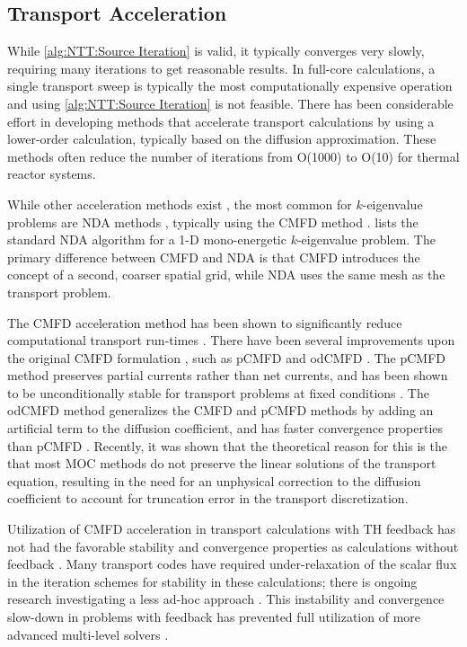 {{        \subsection{Transport Acceleration}{\label{ssec:NTT:Transport Acceleration}
            While \cref{alg:NTT:Source Iteration} is valid, it typically converges very slowly, requiring many iterations to get reasonable results.
            In full-core calculations, a single transport sweep is typically the most computationally expensive operation and using \cref{alg:NTT:Source Iteration} is not feasible.
            There has been considerable effort in developing methods that accelerate transport calculations by using a lower-order calculation, typically based on the diffusion approximation.
            These methods often reduce the number of iterations from O(1000) to O(10) for thermal reactor systems.

            While other acceleration methods exist \cite{Hebert2017}, the most common for $k$-eigenvalue problems are \ac{NDA} methods \cite{Smith2002}, typically using the \ac{CMFD} method \cite{Smith1983}.
             lists the standard \ac{NDA} algorithm for a 1-D mono-energetic $k$-eigenvalue problem.
            The primary difference between \ac{CMFD} and \ac{NDA} is that \ac{CMFD} introduces the concept of a second, coarser spatial grid, while \ac{NDA} uses the same mesh as the transport problem.

            The \ac{CMFD} acceleration method has been shown to significantly reduce computational transport run-times \cite{Smith2002,Anistratov2011,Collins2016}.
            There have been several improvements upon the original \ac{CMFD} formulation \cite{Smith1983}, such as p\ac{CMFD} \cite{Cho2002} and od\ac{CMFD} \cite{Zhu2016}.
            The p\ac{CMFD} method preserves partial currents rather than net currents, and has been shown to be unconditionally stable for transport problems at fixed conditions \cite{Cho2002}.
            The od\ac{CMFD} method generalizes the \ac{CMFD} and p\ac{CMFD} methods by adding an artificial term to the diffusion coefficient, and has faster convergence properties than p\ac{CMFD} \cite{Zhu2016}.
            Recently, it was shown that the theoretical reason for this is the that most \ac{MOC} methods do not preserve the linear solutions of the transport equation, resulting in the need for an unphysical correction to the diffusion coefficient to account for truncation error in the transport discretization.

            Utilization of \ac{CMFD} acceleration in transport calculations with \ac{TH} feedback has not had the favorable stability and convergence properties as calculations without feedback \cite{Kochunas2017}.
            Many transport codes have required under-relaxation of the scalar flux in the iteration schemes for stability in these calculations; there is ongoing research investigating a less ad-hoc approach \cite{Kochunas2017}.
            This instability and convergence slow-down in problems with feedback has prevented full utilization of more advanced multi-level solvers \cite{Kochunas2017,Yee2018a}.

}}}
